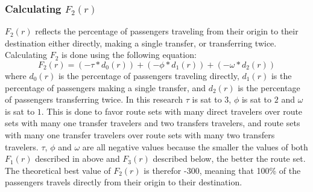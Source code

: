 \subsubsection*{Calculating $F_{2}(r)$}
\label{sec:f2}
$F_{2}(r)$ reflects the percentage of passengers traveling from their origin to their destination either directly, making a single transfer, or transferring twice. Calculating $F_{2}$ is done using the following equation: 
\newline
$$F_2(r) = (-\tau*d_0(r)) + (-\phi*d_1(r)) + (-\omega*d_2(r))$$
\newline
where $d_0(r)$ is the percentage of passengers traveling directly, $d_1(r)$ is the percentage of passengers making a single transfer, and $d_2(r)$ is the percentage of passengers transferring twice. In this research $\tau$ is sat to $3$, $\phi$ is sat to $2$ and $\omega$ is sat to $1$. This is done to favor route sets with many direct travelers over route sets with many one transfer travelers and two transfers travelers, and route sets with many one transfer travelers over route sets with many two transfers travelers. $\tau$, $\phi$ and $\omega$ are all negative values because the smaller the values of both $F_{1}(r)$ described in above and $F_{3}(r)$ described below, the better the route set. The theoretical best value of $F_{2}(r)$ is therefor -300, meaning that 100\% of the passengers travels directly from their origin to their destination. 

